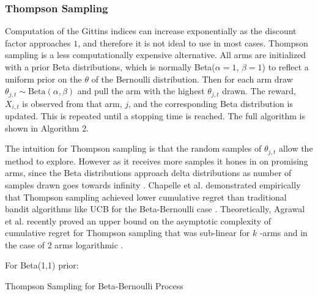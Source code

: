 \documentclass[10pt, conference]{ieeeconf}      %
\begin{document}
\subsubsection{Thompson Sampling}
Computation of the Gittins indices can increase exponentially as the discount factor approaches $1$, and therefore it is not ideal to use in most cases. 
Thompson sampling is a less computationally expensive alternative.
All arms are initialized with a prior Beta distributions, which is normally Beta($\alpha=1$,  $\beta =1$) to reflect a uniform prior on the $\theta$ of the Bernoulli distribution.
Then for each arm draw $\theta_{j,t} \sim \mbox{Beta}(\alpha,\beta)$ and pull the arm with the highest $\theta_{j,t}$ drawn.
The reward, $X_{i,t}$ is observed from that arm, $j$, and the corresponding Beta distribution is updated.
This is repeated until a stopping time is reached. The full algorithm is shown in Algorithm 2.  

The intuition for Thompson sampling is that the random samples of $\theta_{j,t}$ allow the method to explore. However as it receives more samples it hones in on promising arms, since the Beta distributions approach delta distributions as number of samples drawn goes towards infinity \cite{goetschalckx2011continuous}. Chapelle et al. demonstrated empirically that Thompson sampling achieved lower cumulative regret than traditional bandit algorithms like UCB for the Beta-Bernoulli case \cite{chapelle2011empirical}. Theoretically, Agrawal et al. recently proved an upper bound on the asymptotic complexity of  cumulative regret for  Thompson sampling that was sub-linear  for $k$ -arms and in the case of $2$ arms logarithmic \cite{agrawal2011analysis}. 

\begin{algorithm}
 For Beta(1,1) prior: \\
 \caption{Thompson Sampling for Beta-Bernoulli Process}
\end{algorithm}
\vspace{-2ex}
\end{document}
